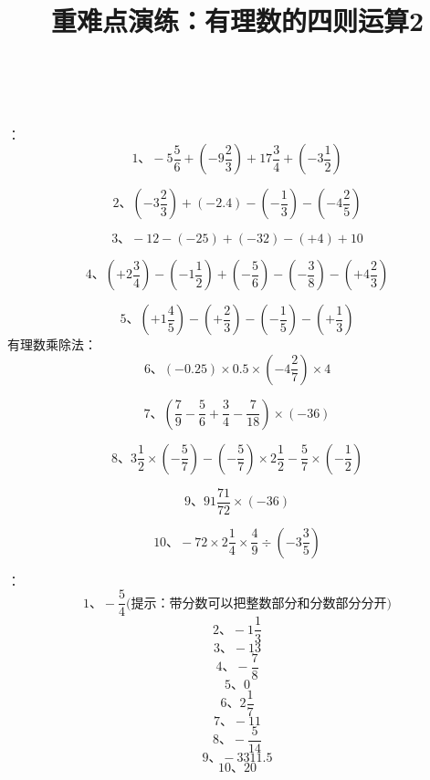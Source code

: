 \documentclass[fleqn]{article}
\title{重难点演练：有理数的四则运算2}
\begin{document}
  \hspace{4cm}{\Large 重难点演练：有理数的四则运算2}
  \\
  \\
  
  ：\\
  \[\text{1、} -5\frac56+(-9\frac23)+17\frac34+(-3\frac12)\]
  
  \[\text{2、} (-3\frac23)+(-2.4)-(-\frac13)-(-4\frac25)\]
  
  \[\text{3、} -12-(-25)+(-32)-(+4)+10\]
  
  \[\text{4、} (+2\frac34)-(-1\frac12)+(-\frac56)-(-\frac38)-(+4\frac23)\]
  
  \[\text{5、} (+1\frac45)-(+\frac23)-(-\frac15)-(+\frac13)\]
  有理数乘除法：
  \[\text{6、} (-0.25)\times0.5\times(-4\frac27)\times4\]
  
  \[\text{7、} (\frac79-\frac56+\frac34-\frac7{18})\times(-36)\]
  
  \[\text{8、} 3\frac12\times(-\frac57)-(-\frac57)\times2\frac12-\frac57\times(-\frac12)\]
  
  \[\text{9、} 91\frac{71}{72}\times(-36)\]
  
  \[\text{10、} -72\times2\frac14\times\frac49\div(-3\frac35)\]
    
    \newpage
    ：
    \[\text{1、} -\frac54\text{(提示：带分数可以把整数部分和分数部分分开)}\]
    \[\text{2、} -1\frac13\]
    \[\text{3、} -13\]
    \[\text{4、} -\frac78\]
    \[\text{5、} 0\]
    \[\text{6、} 2\frac17\]
    \[\text{7、} -11\]
    \[\text{8、} -\frac5{14}\]
    \[\text{9、} -3311.5\]
    \[\text{10、} 20\]
\end{document}
